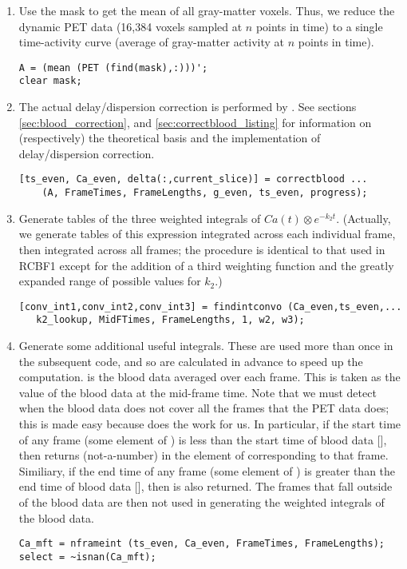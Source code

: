 \begin{enumerate}
\item Use the mask to get the mean of all gray-matter voxels.
  Thus, we reduce the dynamic PET data (16,384 voxels sampled at
  $n$ points in time) to a single time-activity curve (average of
  gray-matter activity at $n$ points in time).
  \begin{verbatim}
A = (mean (PET (find(mask),:)))';
clear mask;
  \end{verbatim}

\item The actual delay/dispersion correction is performed by
  .  See sections \ref{sec:blood_correction}, and
  \ref{sec:correctblood_listing} for information on (respectively) the
  theoretical basis and the implementation of delay/dispersion
  correction.
  \begin{verbatim}
[ts_even, Ca_even, delta(:,current_slice)] = correctblood ...
    (A, FrameTimes, FrameLengths, g_even, ts_even, progress);
  \end{verbatim}

\item Generate tables of the three weighted integrals of $Ca(t)
  \otimes e^{-k_{2}t}$.  (Actually, we generate tables of this
  expression integrated across each individual frame, then integrated
  across all frames; the procedure is identical to that used in RCBF1
  except for the addition of a third weighting function and the
  greatly expanded range of possible values for $k_2$.)
  \begin{verbatim}
[conv_int1,conv_int2,conv_int3] = findintconvo (Ca_even,ts_even,...
   k2_lookup, MidFTimes, FrameLengths, 1, w2, w3);
  \end{verbatim}

\item Generate some additional useful integrals.  These are used more
  than once in the subsequent code, and so are calculated in advance
  to speed up the computation.   is the blood data
  averaged over each frame.  This is taken as the value of the blood
  data at the mid-frame time.  Note that we must detect when the blood
  data does not cover all the frames that the PET data does; this is
  made easy because  does the work for us.  In
  particular, if the start time of any frame (some element of
  ) is less than the start time of blood data
  [], then  returns 
  (not-a-number) in the element of  corresponding to that
  frame.  Similiary, if the end time of any frame (some element of
  ) is greater than the end time of
  blood data [], then 
  is also returned.  The frames that fall outside of the blood data
  are then not used in generating the weighted integrals of the blood data.
\begin{verbatim}
Ca_mft = nframeint (ts_even, Ca_even, FrameTimes, FrameLengths);      
select = ~isnan(Ca_mft);


\end{verbatim}
\end{enumerate}

